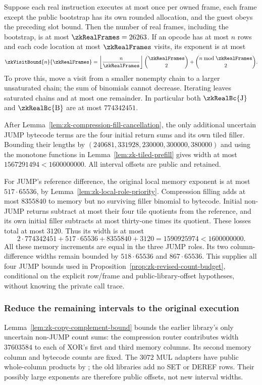 Suppose each real instruction executes at most once per owned frame, each frame except the public bootstrap has its own rounded allocation, and the guest obeys the preceding slot bound. Then the number of real frames, including the bootstrap, is at most $\zkRealFrames=26263$. If an opcode has at most $n$ rows and each code location at most $\zkRealFrames$ visits, its exponent is at most
\[
 \zkVisitBound{n}{\zkRealFrames}
 =\left\lfloor\frac n{\zkRealFrames}\right\rfloor\binom{\zkRealFrames}2
  +\binom{n\bmod\zkRealFrames}2.
\]
To prove this, move a visit from a smaller nonempty chain to a larger unsaturated chain; the sum of binomials cannot decrease. Iterating leaves saturated chains and at most one remainder. In particular both $\zkRealBc{\mathrm J}$ and $\zkRealBc{\mathrm B}$ are at most $774342451$.

After Lemma~\ref{lem:zk-compression-fill-cancellation}, the only additional uncertain JUMP bytecode terms are the four initial return sums and its own tiled filler. Bounding their lengths by $(240681,331928,230000,300000,380000)$ and using the monotone functions in Lemma~\ref{lem:zk-tiled-prefill} gives width at most $1567291494<1600000000$. All interval offsets are public and retained.

For JUMP's reference difference, the original local memory exponent is at most $517\cdot65536$, by Lemma~\ref{lem:zk-local-role-priority}. Compression filling adds at most $8355840$ to memory but no surviving filler binomial to bytecode. Initial non-JUMP returns subtract at most their four tile quotients from the reference, and its own initial filler subtracts at most thirty-one times its quotient. These losses total at most $3120$. Thus its width is at most
\[
 2\cdot774342451+517\cdot65536+8355840+3120
 =1590925974<1600000000.
\]
All these memory increments are equal in the three JUMP roles. Its two column-difference widths remain bounded by $518\cdot65536$ and $867\cdot65536$. This supplies all four JUMP bounds used in Proposition~\ref{prop:zk-revised-count-budget}, conditional on the explicit row/frame and public-library-offset hypotheses, without knowing the private call trace.

\subsubsection{Reduce the remaining intervals to the original execution}

Lemma~\ref{lem:zk-copy-complement-bound} bounds the earlier library's only uncertain non-JUMP count sums: the compression router contributes width $37603584$ to each of XOR's first and third memory columns. Its second memory column and bytecode counts are fixed. The $3072$ MUL adapters have public whole-column products by ; the old libraries add no SET or DEREF rows. Their possibly large exponents are therefore public offsets, not new interval widths.

